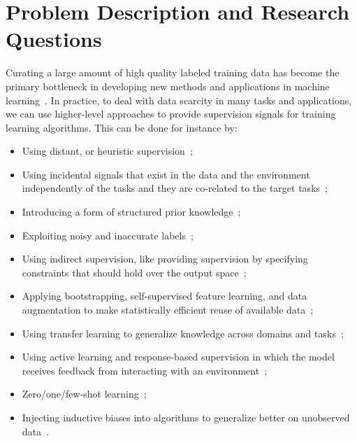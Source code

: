 \section{Problem Description and Research Questions}
Curating a large amount of high quality labeled training data has become the primary bottleneck in developing new methods and applications in machine learning~\citep{Ratner:2016}. 
In practice, to deal with data scarcity in many tasks and applications, we can use higher-level approaches to provide supervision signals for training learning algorithms. 
This can be done for instance by:
\begin{itemize}
\setlength\itemsep{0em}
\item 
Using distant, or heuristic supervision~\citep{Deriu2016:SemEval,Severyn:2015:SemEval, Dehghani:2016:SIGIR, dehghani:2018:ICLR, Dehghani:2017:nips_metalearn, Ratner:2016,Rekatsinas:2017,Varma:2017};
%
\item
Using incidental signals that exist in the data and the environment independently of the tasks and they are co-related to the target tasks~\citep{roth2017incidental}; 
%
\item
Introducing a form of structured prior knowledge~\citep{Dehghani:CIKM2016:long,Dehghani:2016:ICTIR};
%
\item
Exploiting noisy and inaccurate labels~\citep{Vahdat:2017, Lee:2013,Hinton:2015,Brodley:1999,reed2014training, Patrini:2016, patrini2016loss,malach2017decoupling};
%
\item
Using indirect supervision, like providing supervision by specifying constraints that should hold over the output space~\citep{stewart2017label, clarke2010driving};
%
\item
Applying bootstrapping, self-supervised feature learning, and data augmentation to make statistically efficient reuse of available data~\citep{cubuk2018autoaugment, dosovitskiy2016discriminative,donahue2016adversarial};
%
\item
Using transfer learning to generalize knowledge across domains and tasks~\citep{Ruder:2019};
%
\item
Using active learning and response-based supervision in which the model receives feedback from interacting with an environment~\citep{clarke2010driving,riezler2014response};
%
\item
Zero/one/few-shot learning~\citep{vinyals2016matching,finn2017model,snell2017prototypical,socher2013zero};
%
\item
Injecting inductive biases into algorithms to generalize better on unobserved data~\citep{cohen2016group, cohen2016steerable, Dehghani:ICLR:2019}.
\end{itemize}

